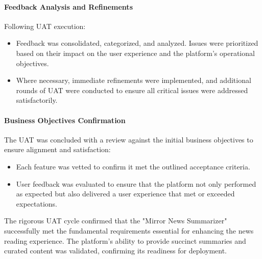 \documentclass[10pt]{article}
\begin{document}
\paragraph{Feedback Analysis and Refinements}
Following UAT execution:
\begin{itemize}
    \item Feedback was consolidated, categorized, and analyzed. Issues were prioritized based on their impact on the user experience and the platform's operational objectives.
    \item Where necessary, immediate refinements were implemented, and additional rounds of UAT were conducted to ensure all critical issues were addressed satisfactorily.
\end{itemize}

\paragraph{Business Objectives Confirmation}
The UAT was concluded with a review against the initial business objectives to ensure alignment and satisfaction:
\begin{itemize}
    \item Each feature was vetted to confirm it met the outlined acceptance criteria.
    \item User feedback was evaluated to ensure that the platform not only performed as expected but also delivered a user experience that met or exceeded expectations.
\end{itemize}

The rigorous UAT cycle confirmed that the "Mirror News Summarizer" successfully met the fundamental requirements essential for enhancing the news reading experience. The platform's ability to provide succinct summaries and curated content was validated, confirming its readiness for deployment.

\end{document}

